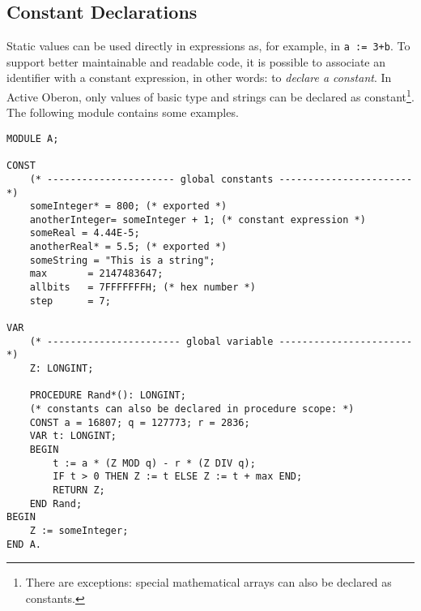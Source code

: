 \documentclass[a4paper,11pt]{article}
\begin{document}
\subsection{Constant Declarations}
Static values can be used directly in expressions as, for example, in \verb~a := 3+b~. To support better maintainable and readable code, it is possible to associate an identifier with a constant expression, in other words: to {\em declare a constant}. In Active Oberon, only values of basic type and strings can be declared as constant\footnote{There are exceptions: special mathematical arrays can also be declared as constants.}. The following module contains some examples.

\begin{lstlisting}[language=Oberon,frame=none,caption={Declaration and Usage of Constants}]
MODULE A;

CONST
    (* ---------------------- global constants ----------------------- *)
    someInteger* = 800; (* exported *)
    anotherInteger= someInteger + 1; (* constant expression *)
    someReal = 4.44E-5;
    anotherReal* = 5.5; (* exported *)
    someString = "This is a string";
    max       = 2147483647;
    allbits   = 7FFFFFFFH; (* hex number *)
    step      = 7;

VAR
    (* ----------------------- global variable ----------------------- *)
    Z: LONGINT;

    PROCEDURE Rand*(): LONGINT;
    (* constants can also be declared in procedure scope: *)
    CONST a = 16807; q = 127773; r = 2836;
    VAR t: LONGINT;
    BEGIN
        t := a * (Z MOD q) - r * (Z DIV q);
        IF t > 0 THEN Z := t ELSE Z := t + max END;
        RETURN Z;
    END Rand;
BEGIN
    Z := someInteger;
END A.
\end{lstlisting}
\end{document}
